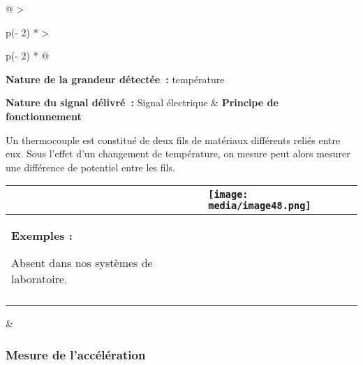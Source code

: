 \documentclass[
]{article}
\begin{document}
\begin{longtable}[]{@{}
  >{\raggedright\arraybackslash}p{(\columnwidth - 2\tabcolsep) * }
  >{\raggedright\arraybackslash}p{(\columnwidth - 2\tabcolsep) * }@{}}
\toprule
\textbf{Nature de la grandeur détectée~:} température

\textbf{Nature du signal délivré~:} Signal électrique & \textbf{Principe
de fonctionnement}

Un thermocouple est constitué de deux fils de matériaux différents
reliés entre eux. Sous l'effet d'un changement de température, on mesure
peut alors mesurer une différence de potentiel entre les fils. \\
\midrule
\endhead
\begin{minipage}[t]{\linewidth}\raggedright
\begin{longtable}[]{@{}
  >{\raggedright\arraybackslash}p{}
  >{\raggedright\arraybackslash}p{}@{}}
\toprule
&
\texttt{[image: media/image48.png]} \\
\midrule
\endhead
\textbf{Exemples :}

Absent dans nos systèmes de laboratoire. & \\
& \\
\bottomrule
\end{longtable}
\end{minipage} & \\
\bottomrule
\end{longtable}

\hypertarget{mesure-de-laccuxe9luxe9ration}{%
\subsubsection{Mesure de
l'accélération}\label{mesure-de-laccuxe9luxe9ration}}
\end{document}
